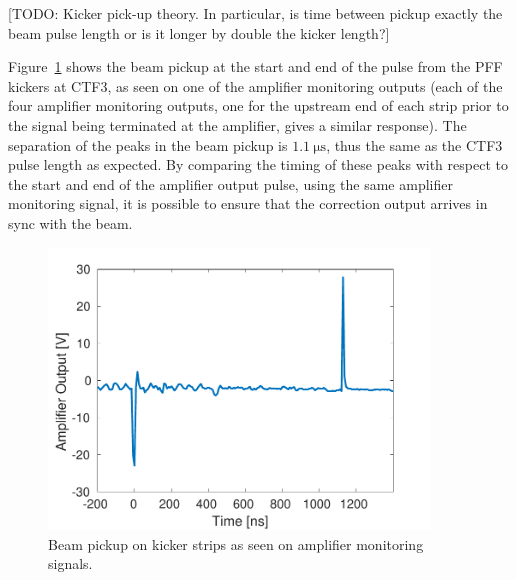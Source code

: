 [TODO: Kicker pick-up theory. In particular, is time between pickup exactly the beam pulse length or is it longer by double the kicker length?]

Figure~\ref{f:beamPickup_noKick} shows the beam pickup at the start and end of the pulse from the PFF kickers at CTF3, as seen on one of the amplifier monitoring outputs (each of the four amplifier monitoring outputs, one for the upstream end of each strip prior to the signal being terminated at the amplifier, gives a similar response). The separation of the peaks in the beam pickup is \(1.1~\mathrm{\mu s}\), thus the same as the CTF3 pulse length as expected. By comparing the timing of these peaks with respect to the start and end of the amplifier output pulse, using the same amplifier monitoring signal, it is possible to ensure that the correction output arrives in sync with the beam.

\begin{figure}
  \centering
  \includegraphics[width=0.9\textwidth]{Figures/commissioning/beamPickup_noKick}
  \caption{Beam pickup on kicker strips as seen on amplifier monitoring signals.}
  \label{f:beamPickup_noKick}
\end{figure}

